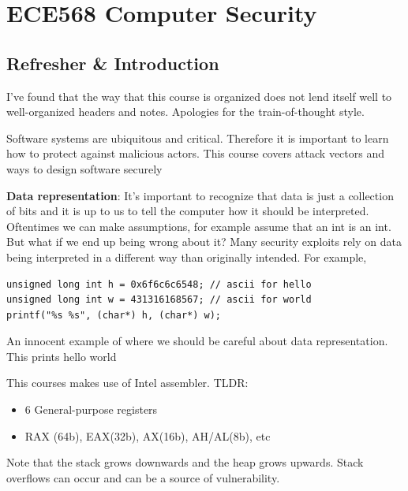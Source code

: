 \documentclass[../notes.tex]{subfiles}
\begin{document}
\section{ECE568 Computer Security}

\subsection{Refresher \& Introduction}

\begin{blockquote}
    I've found that the way that this course is organized does not lend itself well to well-organized headers and notes. Apologies for the train-of-thought style.
\end{blockquote}


Software systems are ubiquitous and critical. Therefore it is important to learn how to protect against malicious actors. This course covers attack vectors and ways to design software securely



\textbf{Data representation}: It's important to recognize that data is just a collection of bits and it is up to us to tell the computer how it should be interpreted. Oftentimes we can make assumptions, for example assume that an int is an int. But what if we end up being wrong about it? 
Many security exploits rely on data being interpreted in a different way than originally intended.
For example,

\begin{listing}[H]
\begin{verbatim}
unsigned long int h = 0x6f6c6c6548; // ascii for hello
unsigned long int w = 431316168567; // ascii for world
printf("%s %s", (char*) h, (char*) w);
\end{verbatim}
\caption{An innocent example of where we should be careful about data representation. This prints hello world}
\end{listing}

This courses makes use of Intel assembler.
TLDR:

\begin{itemize}
  \item 6 General-purpose registers
  \item RAX (64b), EAX(32b), AX(16b), AH/AL(8b), etc
\end{itemize}

Note that the stack grows downwards and the heap grows upwards. Stack overflows can occur and can be a source of vulnerability.
\end{document}
